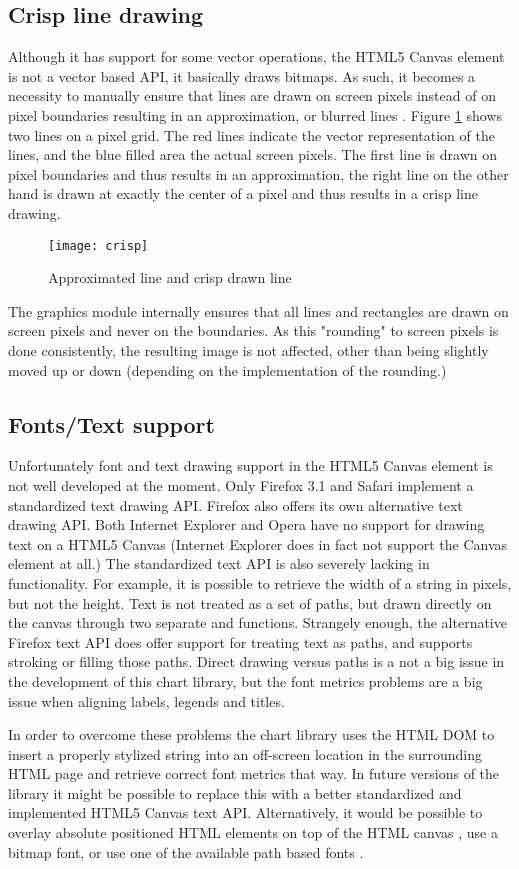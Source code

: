 \subsection{Crisp line drawing}
Although it has support for some vector operations, the HTML5 Canvas element is not a vector based API, it basically draws bitmaps. As such, it becomes a necessity to manually ensure that lines are drawn on screen pixels instead of on pixel boundaries resulting in an approximation, or blurred lines \cite{shepherd08}. Figure \ref{crisp} shows two lines on a pixel grid. The red lines indicate the vector representation of the lines, and the blue filled area the actual screen pixels. The first line is drawn on pixel boundaries and thus results in an approximation, the right line on the other hand is drawn at exactly the center of a pixel and thus results in a crisp line drawing.

\begin{figure}[h!]
\centering
\texttt{[image: crisp]}
\caption{Approximated line and crisp drawn line}
\label{crisp}
\end{figure}

The graphics module internally ensures that all lines and rectangles are drawn on screen pixels and never on the boundaries. As this "rounding" to screen pixels is done consistently, the resulting image is not affected, other than being slightly moved up or down (depending on the implementation of the rounding.)

\subsection{Fonts/Text support}
Unfortunately font and text drawing support in the HTML5 Canvas element is not well developed at the moment. Only Firefox 3.1 and Safari implement a standardized text drawing API. Firefox also offers its own alternative text drawing API. Both Internet Explorer and Opera have no support for drawing text on a HTML5 Canvas (Internet Explorer does in fact not support the Canvas element at all.) The standardized text API is also severely lacking in functionality. For example, it is possible to retrieve the width of a string in pixels, but not the height. Text is not treated as a set of paths, but drawn directly on the canvas through two separate  and  functions. Strangely enough, the alternative Firefox text API does offer support for treating text as paths, and supports stroking or filling those paths. Direct drawing versus paths is a not a big issue in the development of this chart library, but the font metrics problems are a big issue when aligning labels, legends and titles.

In order to overcome these problems the chart library uses the HTML DOM to insert a properly stylized string into an off-screen location in the surrounding HTML page and retrieve correct font metrics that way. In future versions of the library it might be possible to replace this with a better standardized and implemented HTML5 Canvas text API. Alternatively, it would be possible to overlay absolute positioned HTML elements on top of the HTML canvas \cite{steele06}, use a bitmap font, or use one of the available path based fonts \cite{studt07, effenberger08, greenpoint08}.
